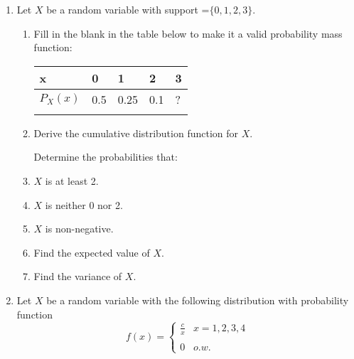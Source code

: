 \documentclass[11pt]{article}\usepackage[]{graphicx}\usepackage[]{color}
\begin{document}

\pagestyle{fancy} 


\begin{enumerate}
	
	\item Let $X$ be a random variable with support =$\{0,1,2,3\}$. 
   \begin{enumerate}
   \item Fill in the blank in the table below to make it a valid probability mass function:
  \begin{table}[h!]
     \centering
     \begin{tabular}{|l|p{2cm}|p{2cm}|p{2cm}|p{2cm}|}
        \hline
          x & 0 & 1 & 2  & 3 \\\hline 
          
          $P_X(x)$ & 0.5& 0.25 & 0.1 & ? \\
          &&&&\\\hline

     \end{tabular}

  \end{table}   
  
  \vspace{2cm}
  
  \item Derive the cumulative distribution function for $X$.
  
  \vspace{2cm}
   
Determine the probabilities that:
  \item $X$ is at least 2.
   \vspace{2cm}
  \item $X$ is neither 0 nor 2.
   \vspace{2cm}
  \item $X$ is non-negative.
   \vspace{2cm}
  \item Find the expected value  of $X$.
   \vspace{3cm}
  \item Find the variance of $X$.
   \vspace{3cm}


   \end{enumerate}

	
	\item Let $X$ be a random variable with the following distribution with probability function 
	$$f(x) = \begin{cases} \frac{c}{x} & x = 1, 2, 3, 4 \\\\ 0 & o.w. \end{cases} $$ 
	

\end{enumerate}
\end{document}
